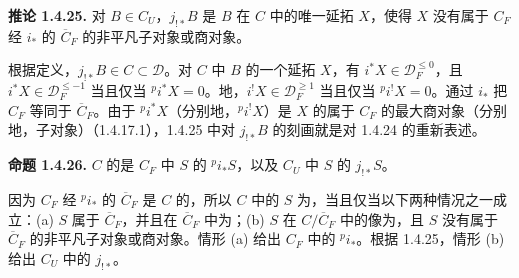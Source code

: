 \par\medskip\noindent\textbf{推论 1.4.25.}
对 $B\in C_U$，$j_{!*}B$ 是 $B$ 在 $C$ 中的唯一延拓 $X$，使得 $X$ 没有属于 $C_F$ 经 $i_*$ 的 $\overline C_F$ 的非平凡子对象或商对象。

根据定义，$j_{!*}B\in C\subset\mathcal D$。对 $C$ 中 $B$ 的一个延拓 $X$，有 $i^*X\in\mathcal D_F^{\le0}$，且 $i^*X\in\mathcal D_F^{\le-1}$ 当且仅当 ${}^pi^*X=0$。地，$i^!X\in\mathcal D_F^{\ge1}$ 当且仅当 ${}^pi^!X=0$。通过 $i_*$ 把 $C_F$ 等同于 $\overline C_F$。由于 ${}^pi^*X$（分别地，${}^pi^!X$）是 $X$ 的属于 $C_F$ 的最大商对象（分别地，子对象）（1.4.17.1），1.4.25 中对 $j_{!*}B$ 的刻画就是对 1.4.24 的重新表述。

\par\medskip\noindent\textbf{命题 1.4.26.}
$C$ 的是 $C_F$ 中 $S$ 的 ${}^pi_*S$，以及 $C_U$ 中 $S$ 的 $j_{!*}S$。

因为 $C_F$ 经 ${}^pi_*$ 的 $\overline C_F$ 是 $C$ 的，所以 $C$ 中的 $S$ 为，当且仅当以下两种情况之一成立：(a) $S$ 属于 $\overline C_F$，并且在 $\overline C_F$ 中为；(b) $S$ 在 $C/\overline C_F$ 中的像为，且 $S$ 没有属于 $\overline C_F$ 的非平凡子对象或商对象。情形 (a) 给出 $C_F$ 中的 ${}^pi_*$。根据 1.4.25，情形 (b) 给出 $C_U$ 中的 $j_{!*}$。
